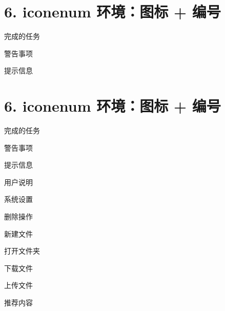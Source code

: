 	\section*{6. iconenum 环境：图标 + 编号}
	\begin{iconenum}
		\item[\faCheckCircle] 完成的任务
		\item[\faExclamationTriangle] 警告事项
		\item[\faInfoCircle] 提示信息
	\end{iconenum}
	
	\section*{6. iconenum 环境：图标 + 编号}
	\begin{iconenum}
		\item[\faCheckCircle] 完成的任务
		\item[\faExclamationTriangle] 警告事项
		\item[\faInfoCircle] 提示信息
		\item[\faUser] 用户说明
		\item[\faCog] 系统设置
		\item[\faTrash] 删除操作
		\item[\faFile] 新建文件
		\item[\faFolderOpen] 打开文件夹
		\item[\faDownload] 下载文件
		\item[\faUpload] 上传文件
		\item[\faStar] 推荐内容
	\end{iconenum}
	
